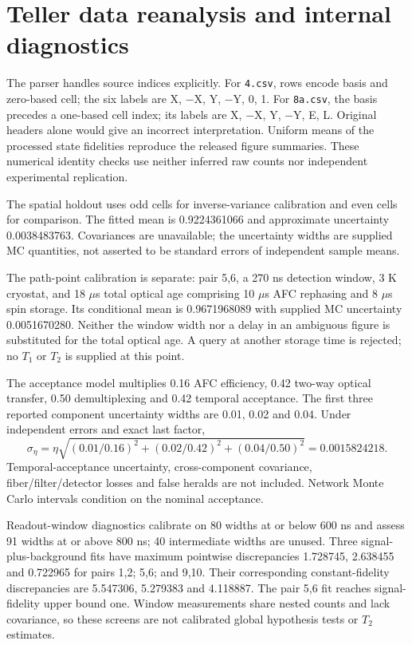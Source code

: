 \documentclass[10pt,a4paper]{article}
\newcommand{\code}[1]{\texttt{#1}}
\begin{document}
\section{Teller data reanalysis and internal diagnostics}
The parser handles source indices explicitly. For \code{4.csv}, rows encode basis and zero-based cell; the six labels are X, $-$X, Y, $-$Y, 0, 1. For \code{8a.csv}, the basis precedes a one-based cell index; its labels are X, $-$X, Y, $-$Y, E, L. Original headers alone would give an incorrect interpretation. Uniform means of the processed state fidelities reproduce the released figure summaries. These numerical identity checks use neither inferred raw counts nor independent experimental replication.

The spatial holdout uses odd cells for inverse-variance calibration and even cells for comparison. The fitted mean is 0.9224361066 and approximate uncertainty 0.0038483763. Covariances are unavailable; the uncertainty widths are supplied MC quantities, not asserted to be standard errors of independent sample means.


The path-point calibration is separate: pair 5,6, a 270 ns detection window, 3 K cryostat, and 18 $\mu$s total optical age comprising 10 $\mu$s AFC rephasing and 8 $\mu$s spin storage. Its conditional mean is 0.9671968089 with supplied MC uncertainty 0.0051670280. Neither the window width nor a delay in an ambiguous figure is substituted for the total optical age. A query at another storage time is rejected; no $T_1$ or $T_2$ is supplied at this point.

The acceptance model multiplies 0.16 AFC efficiency, 0.42 two-way optical transfer, 0.50 demultiplexing and 0.42 temporal acceptance. The first three reported component uncertainty widths are 0.01, 0.02 and 0.04. Under independent errors and exact last factor,
\[
\sigma_\eta=\eta\sqrt{(0.01/0.16)^2+(0.02/0.42)^2+(0.04/0.50)^2}
=0.0015824218.
\]
Temporal-acceptance uncertainty, cross-component covariance, fiber/filter/detector losses and false heralds are not included. Network Monte Carlo intervals condition on the nominal acceptance.

Readout-window diagnostics calibrate on 80 widths at or below 600 ns and assess 91 widths at or above 800 ns; 40 intermediate widths are unused. Three signal-plus-background fits have maximum pointwise discrepancies 1.728745, 2.638455 and 0.722965 for pairs 1,2; 5,6; and 9,10. Their corresponding constant-fidelity discrepancies are 5.547306, 5.279383 and 4.118887. The pair 5,6 fit reaches signal-fidelity upper bound one. Window measurements share nested counts and lack covariance, so these screens are not calibrated global hypothesis tests or $T_2$ estimates.
\end{document}
